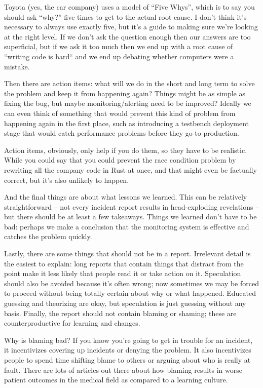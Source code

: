\documentclass[a4paper]{report}
\begin{document}
Toyota (yes, the car company) uses a model of ``Five Whys'', which is to say you should ask ``why?'' five times to get to the actual root cause. I don't think it's necessary to always use exactly five, but it's a guide to making sure we're looking at the right level. If we don't ask the question enough then our answers are too superficial, but if we ask it too much then we end up with a root cause of ``writing code is hard`` and we end up debating whether computers were a mistake.

Then there are action items: what will we do in the short and long term to solve the problem and keep it from happening again? Things might be as simple as fixing the bug, but maybe monitoring/alerting need to be improved? Ideally we can even think of something that would prevent this kind of problem from happening again in the first place, such as introducing a testbench deployment stage that would catch performance problems before they go to production. 

Action items, obviously, only help if you do them, so they have to be realistic. While you could say that you could prevent the race condition problem by rewriting all the company code in Rust at once, and that might even be factually correct, but it's also unlikely to happen.

And the final things are about what lessons we learned. This can be relatively straightforward -- not every incident report results in head-exploding revelations -- but there should be at least a few takeaways. Things we learned don't have to be bad: perhaps we make a conclusion that the monitoring system is effective and catches the problem quickly. 

Lastly, there are some things that should not be in a report. Irrelevant detail is the easiest to explain: long reports that contain things that distract from the point make it less likely that people read it or take action on it. Speculation should also be avoided because it's often wrong; now sometimes we may be forced to proceed without being totally certain about why or what happened. Educated guessing and theorizing are okay, but speculation is just guessing without any basis. Finally, the report should not contain blaming or shaming; these are counterproductive for learning and changes. 

Why is blaming bad? If you know you're going to get in trouble for an incident, it incentivizes covering up incidents or denying the problem. It also incentivizes people to spend time shifting blame to others or arguing about who is really at fault. There are lots of articles out there about how blaming results in worse patient outcomes in the medical field as compared to a learning culture.
\end{document}
